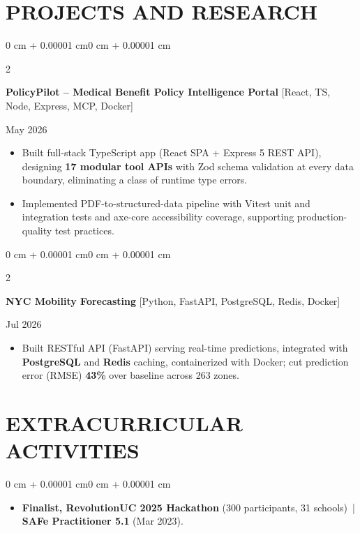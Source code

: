 \documentclass[10pt, letterpaper]{article}
\newenvironment{highlights}{
    \begin{itemize}[
        topsep=0.10 cm,
        parsep=0.06 cm,
        partopsep=0pt,
        itemsep=0.06 cm,
        leftmargin=12pt
    ]
}{
    \end{itemize}
}
\newenvironment{onecolentry}{
    \begin{adjustwidth}{0 cm + 0.00001 cm}{0 cm + 0.00001 cm}
}{
    \end{adjustwidth}
}
\newenvironment{twocolentry}[2][]{
    \onecolentry
    \def\secondColumn{#2}
    \setcolumnwidth{\fill, 4.5 cm}
    \begin{paracol}{2}
}{
    \switchcolumn \raggedleft \secondColumn
    \end{paracol}
    \endonecolentry
}
\begin{document}
\section{PROJECTS AND RESEARCH}
\begin{twocolentry}{May 2026}
\textbf{PolicyPilot -- Medical Benefit Policy Intelligence Portal} [React, TS, Node, Express, MCP, Docker]
\end{twocolentry}
\begin{highlights}
  \item Built full-stack TypeScript app (React SPA + Express 5 REST API), designing \textbf{17 modular tool APIs} with Zod schema validation at every data boundary, eliminating a class of runtime type errors.
  \item Implemented PDF-to-structured-data pipeline with Vitest unit and integration tests and axe-core accessibility coverage, supporting production-quality test practices.
\end{highlights}

\vspace{0.12 cm}

\begin{twocolentry}{Jul 2026}
\textbf{NYC Mobility Forecasting} [Python, FastAPI, PostgreSQL, Redis, Docker]
\end{twocolentry}
\begin{highlights}
  \item Built RESTful API (FastAPI) serving real-time predictions, integrated with \textbf{PostgreSQL} and \textbf{Redis} caching, containerized with Docker; cut prediction error (RMSE) \textbf{43\%} over baseline across 263 zones.
\end{highlights}

\section{EXTRACURRICULAR ACTIVITIES}
\begin{onecolentry}
\begin{highlights}
  \item \textbf{Finalist, RevolutionUC 2025 Hackathon} (300 participants, 31 schools) \,|\, \textbf{SAFe Practitioner 5.1} (Mar 2023).
\end{highlights}
\end{onecolentry}
\end{document}
